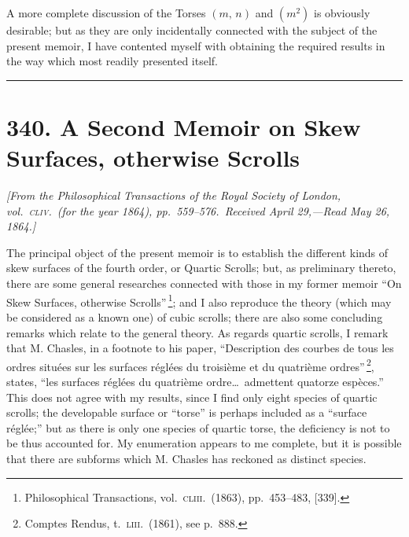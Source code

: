 \documentclass[11pt,a4paper]{article}
\begin{document}
\medskip

A more complete discussion of the Torses $(m,\,n)$ and $(m^2)$ is obviously desirable; but as they are only incidentally connected with the subject of the present memoir, I have contented myself with obtaining the required results in the way which most readily presented itself.

\bigskip
\noindent\rule{\textwidth}{0.4pt}
\bigskip

\section*{340. A Second Memoir on Skew Surfaces, otherwise Scrolls}

\begin{center}
\textit{[From the Philosophical Transactions of the Royal Society of London, vol.\ \textsc{cliv}.\ (for the year 1864), pp.\ 559--576.\ Received April 29,---Read May 26, 1864.]}
\end{center}

The principal object of the present memoir is to establish the different kinds of skew surfaces of the fourth order, or Quartic Scrolls; but, as preliminary thereto, there are some general researches connected with those in my former memoir ``On Skew Surfaces, otherwise Scrolls''\,\footnote{Philosophical Transactions, vol.\ \textsc{cliii}.\ (1863), pp.\ 453--483, [339].}; and I also reproduce the theory (which may be considered as a known one) of cubic scrolls; there are also some concluding remarks which relate to the general theory. As regards quartic scrolls, I remark that M. Chasles, in a footnote to his paper, ``Description des courbes de tous les ordres situ\'ees sur les surfaces r\'egl\'ees du troisi\`eme et du quatri\`eme ordres''\,\footnote{Comptes Rendus, t.\ \textsc{liii}.\ (1861), see p.~888.}, states, ``les surfaces r\'egl\'ees du quatri\`eme ordre\ldots\ admettent quatorze esp\`eces.'' This does not agree with my results, since I find only eight species of quartic scrolls; the developable surface or ``torse'' is perhaps included as a ``surface r\'egl\'ee;'' but as there is only one species of quartic torse, the deficiency is not to be thus accounted for. My enumeration appears to me complete, but it is possible that there are subforms which M. Chasles has reckoned as distinct species.

\bigskip
\end{document}
